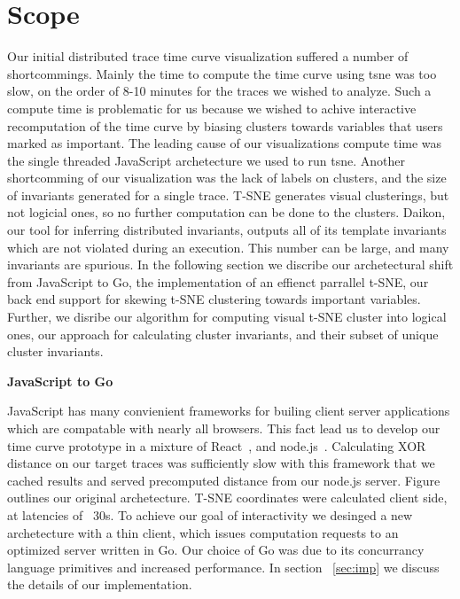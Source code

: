 \section{Scope}
\label{sec:scope}

Our initial distributed trace time curve visualization suffered a number of
shortcommings. Mainly the time to compute the time curve using tsne was too
slow, on the order of 8-10 minutes for the traces we wished to analyze. Such a
compute time is problematic for us because we wished to achive interactive
recomputation of the time curve by biasing clusters towards variables that
users marked as important. The leading cause of our visualizations compute time
was the single threaded JavaScript archetecture we used to run tsne. Another
shortcomming of our visualization was the lack of labels on clusters, and the
size of invariants generated for a single trace. T-SNE generates visual
clusterings, but not logicial ones, so no further computation can be done to
the clusters. Daikon, our tool for inferring distributed invariants, outputs
all of its template invariants which are not violated during an execution. This
number can be large, and many invariants are spurious. In the following section
we discribe our archetectural shift from JavaScript to Go, the implementation
of an effienct parrallel t-SNE, our back end support for skewing t-SNE
clustering towards important variables. Further, we disribe our algorithm for
computing visual t-SNE cluster into logical ones, our approach for calculating
cluster invariants, and their subset of unique cluster invariants.

\textbf{JavaScript to Go}

JavaScript has many convienient frameworks for builing client server
applications which are compatable with nearly all browsers. This fact lead us
to develop our time curve prototype in a mixture of React~\cite{react}, and
node.js~\cite{node.js}. Calculating XOR distance on our target traces was
sufficiently slow with this framework that we cached results and served
precomputed distance from our node.js server. Figure outlines our original archetecture. T-SNE coordinates
were calculated client side, at latencies of ~30s. To achieve our goal of
interactivity we desinged a new archetecture with a thin client, which issues
computation requests to an optimized server written in Go. Our choice of Go was
due to its concurrancy language primitives and increased performance. In
section ~\ref{sec:imp} we discuss the details of our implementation.

